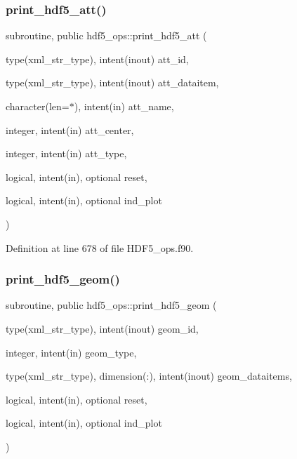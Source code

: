 \subsubsection{\texorpdfstring{print\+\_\+hdf5\+\_\+att()}{print\_hdf5\_att()}}
{\footnotesize\ttfamily subroutine, public hdf5\+\_\+ops\+::print\+\_\+hdf5\+\_\+att (\begin{DoxyParamCaption}\item[{type(xml\+\_\+str\+\_\+type), intent(inout)}]{att\+\_\+id,  }\item[{type(xml\+\_\+str\+\_\+type), intent(inout)}]{att\+\_\+dataitem,  }\item[{character(len=$\ast$), intent(in)}]{att\+\_\+name,  }\item[{integer, intent(in)}]{att\+\_\+center,  }\item[{integer, intent(in)}]{att\+\_\+type,  }\item[{logical, intent(in), optional}]{reset,  }\item[{logical, intent(in), optional}]{ind\+\_\+plot }\end{DoxyParamCaption})}



Definition at line 678 of file H\+D\+F5\+\_\+ops.\+f90.

\mbox{\label{namespacehdf5__ops_ac23a71e7029f46e5f38a95468fc10e22}} 
\subsubsection{\texorpdfstring{print\+\_\+hdf5\+\_\+geom()}{print\_hdf5\_geom()}}
{\footnotesize\ttfamily subroutine, public hdf5\+\_\+ops\+::print\+\_\+hdf5\+\_\+geom (\begin{DoxyParamCaption}\item[{type(xml\+\_\+str\+\_\+type), intent(inout)}]{geom\+\_\+id,  }\item[{integer, intent(in)}]{geom\+\_\+type,  }\item[{type(xml\+\_\+str\+\_\+type), dimension(\+:), intent(inout)}]{geom\+\_\+dataitems,  }\item[{logical, intent(in), optional}]{reset,  }\item[{logical, intent(in), optional}]{ind\+\_\+plot }\end{DoxyParamCaption})}



